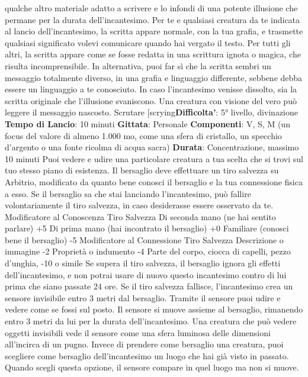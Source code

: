 \begin{multicols}{2}
qualche altro materiale adatto a scrivere e lo infondi di
una potente illusione che permane per la durata
dell’incantesimo.
Per te e qualsiasi creatura da te indicata al lancio
dell’incantesimo, la scritta appare normale, con la tua
grafia, e trasmette qualsiasi significato volevi
comunicare quando hai vergato il testo. Per tutti gli altri,
la scritta appare come se fosse redatta in una scrittura
ignota o magica, che risulta incomprensibile. In
alternativa, puoi far sì che la scritta sembri un
messaggio totalmente diverso, in una grafia e
linguaggio differente, sebbene debba essere un
linguaggio a te conosciuto.
In caso l’incantesimo venisse dissolto, sia la scritta
originale che l’illusione svaniscono.
Una creatura con visione del vero può leggere il
messaggio nascosto.
Scrutare
[scrying\textbf{Difficolta'}:
5° livello, divinazione
\textbf{Tempo di Lancio}: 10 minuti
\textbf{Gittata}: Personale
\textbf{Componenti}: V, S, M (un focus del valore di almeno
1.000 mo, come una sfera di cristallo, un specchio
d’argento o una fonte ricolma di acqua sacra)
\textbf{Durata}: Concentrazione, massimo 10 minuti
Puoi vedere e udire una particolare creatura a tua
scelta che si trovi sul tuo stesso piano di esistenza. Il
bersaglio deve effettuare un tiro salvezza su Arbitrio,
modificato da quanto bene conosci il bersaglio e la tua
connessione fisica a esso. Se il bersaglio sa che stai
lanciando l’incantesimo, può fallire volontariamente il
tiro salvezza, in caso desiderasse essere osservato da
te.
Modificatore al
Conoscenza Tiro Salvezza
Di seconda mano (ne hai sentito parlare) +5
Di prima mano (hai incontrato il bersaglio) +0
Familiare (conosci bene il bersaglio) -5
Modificatore al
Connessione Tiro Salvezza
Descrizione o immagine -2
Proprietà o indumento -4
Parte del corpo, ciocca di capelli, pezzo d’unghia, -10
o simile
Se supera il tiro salvezza, il bersaglio ignora gli effetti
dell’incantesimo, e non potrai usare di nuovo questo
incantesimo contro di lui prima che siano passate 24
ore.
Se il tiro salvezza fallisce, l’incantesimo crea un
sensore invisibile entro 3 metri dal bersaglio. Tramite il
sensore puoi udire e vedere come se fossi sul posto. Il
sensore si muove assieme al bersaglio, rimanendo
entro 3 metri da lui per la durata dell’incantesimo. Una
creatura che può vedere oggetti invisibili vede il 
sensore come una sfera luminosa delle dimensioni
all’incirca di un pugno.
Invece di prendere come bersaglio una creatura, puoi
scegliere come bersaglio dell’incantesimo un luogo che
hai già visto in passato. Quando scegli questa opzione,
il sensore compare in quel luogo ma non si muove.

\end{multicols}
